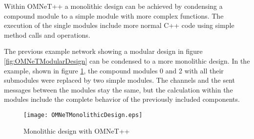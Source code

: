 Within OMNeT++ a monolithic design can be achieved by condensing a compound module to a simple module with more complex functions.
The execution of the single modules include more normal C++ code using simple method calls and operations.

The previous example network showing a modular design in figure \ref{fig:OMNeTModularDesign} can be condensed to a more monolithic design.
In the example, shown in figure \ref{fig:OMNeTMonolithicDesign}, the compound modules 0 and 2 with all their submodules were replaced by two simple modules.
The channels and the sent messages between the modules stay the same, but the calculation within the modules include the complete behavior of the previously included components.

\begin{figure}
    \centering
    \texttt{[image: OMNeTMonolithicDesign.eps]}
    \caption{Monolithic design with OMNeT++}
    \label{fig:OMNeTMonolithicDesign}
\end{figure}

